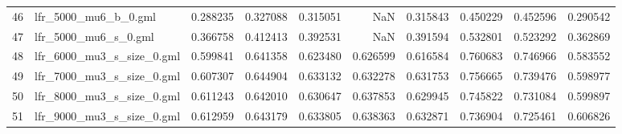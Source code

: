 \begin{tabular}{llrrrrrrrr}
46 &        lfr\_5000\_mu6\_b\_0.gml &                            0.288235 &                       0.327088 &                          0.315051 &                           NaN &                        0.315843 &                     0.450229 &                            0.452596 &                                0.290542 \\
47 &        lfr\_5000\_mu6\_s\_0.gml &                            0.366758 &                       0.412413 &                          0.392531 &                           NaN &                        0.391594 &                     0.532801 &                            0.523292 &                                0.362869 \\
48 &   lfr\_6000\_mu3\_s\_size\_0.gml &                            0.599841 &                       0.641358 &                          0.623480 &                      0.626599 &                        0.616584 &                     0.760683 &                            0.746966 &                                0.583552 \\
49 &   lfr\_7000\_mu3\_s\_size\_0.gml &                            0.607307 &                       0.644904 &                          0.633132 &                      0.632278 &                        0.631753 &                     0.756665 &                            0.739476 &                                0.598977 \\
50 &   lfr\_8000\_mu3\_s\_size\_0.gml &                            0.611243 &                       0.642010 &                          0.630647 &                      0.637853 &                        0.629945 &                     0.745822 &                            0.731084 &                                0.599897 \\
51 &   lfr\_9000\_mu3\_s\_size\_0.gml &                            0.612959 &                       0.643179 &                          0.633805 &                      0.638363 &                        0.632871 &                     0.736904 &                            0.725461 &                                0.606826 \\
\bottomrule
\end{tabular}
